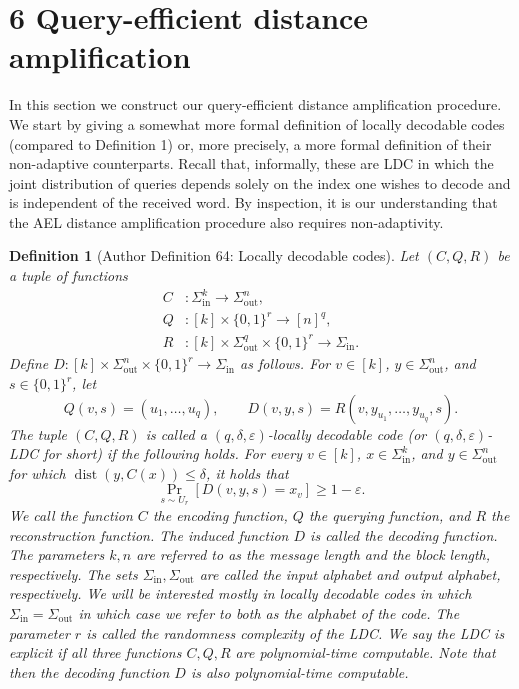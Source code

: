\documentclass[10pt,a4paper]{article}
\newtheorem{ntdefinition}[nttheorem]{Definition}
\begin{document}
\section*{6 Query-efficient distance amplification}
In this section we construct our query-efficient distance amplification procedure. We start by giving a somewhat more formal definition of locally decodable codes (compared to Definition 1) or, more precisely, a more formal definition of their non-adaptive counterparts. Recall that, informally, these are LDC in which the joint distribution of queries depends solely on the index one wishes to decode and is independent of the received word. By inspection, it is our understanding that the AEL distance amplification procedure also requires non-adaptivity.
\setcounter{nttheorem}{63}
\begin{ntdefinition}[Author Definition 64: Locally decodable codes]
Let $(C,Q,R)$ be a tuple of functions
\begin{align*}C&:\Sigma_{\mathrm{in}}^k\to\Sigma_{\mathrm{out}}^n,\\Q&:[k]\times\{0,1\}^r\to[n]^q,\\R&:[k]\times\Sigma_{\mathrm{out}}^q\times\{0,1\}^r\to\Sigma_{\mathrm{in}}.\end{align*}
Define $D:[k]\times\Sigma_{\mathrm{out}}^n\times\{0,1\}^r\to\Sigma_{\mathrm{in}}$ as follows. For $v\in[k]$, $y\in\Sigma_{\mathrm{out}}^n$, and $s\in\{0,1\}^r$, let
\[Q(v,s)=(u_1,\ldots,u_q),\qquad D(v,y,s)=R(v,y_{u_1},\ldots,y_{u_q},s).\]
The tuple $(C,Q,R)$ is called a $(q,\delta,\varepsilon)$-locally decodable code (or $(q,\delta,\varepsilon)$-LDC for short) if the following holds. For every $v\in[k]$, $x\in\Sigma_{\mathrm{in}}^k$, and $y\in\Sigma_{\mathrm{out}}^n$ for which $\operatorname{dist}(y,C(x))\leq\delta$, it holds that
\[\Pr_{s\sim U_r}[D(v,y,s)=x_v]\geq1-\varepsilon.\]
We call the function $C$ the encoding function, $Q$ the querying function, and $R$ the reconstruction function. The induced function $D$ is called the decoding function. The parameters $k,n$ are referred to as the message length and the block length, respectively. The sets $\Sigma_{\mathrm{in}},\Sigma_{\mathrm{out}}$ are called the input alphabet and output alphabet, respectively. We will be interested mostly in locally decodable codes in which $\Sigma_{\mathrm{in}}=\Sigma_{\mathrm{out}}$ in which case we refer to both as the alphabet of the code. The parameter $r$ is called the randomness complexity of the LDC. We say the LDC is explicit if all three functions $C,Q,R$ are polynomial-time computable. Note that then the decoding function $D$ is also polynomial-time computable.
\end{ntdefinition}
\end{document}
